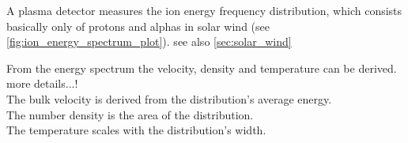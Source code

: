 A plasma detector measures the ion energy frequency distribution, which consists basically only of protons and alphas in solar wind (see \autoref{fig:ion_energy_spectrum_plot}). see also \autoref{sec:solar_wind}
\\
\begin{figure}[htb]
\end{figure}

From the energy spectrum the velocity, density and temperature can be derived.\\
more details...!\\

The bulk velocity is derived from the distribution's average energy.\\
The number density is the area of the distribution.\\
The temperature scales with the distribution's width.\\


